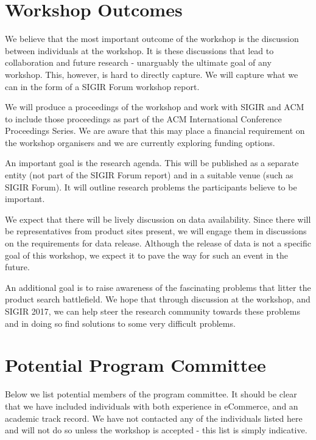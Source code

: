\documentclass{acmart}
\begin{document}
\section{Workshop Outcomes}

We believe that the most important outcome of the workshop is the
discussion between individuals at the workshop.  It is these discussions
that lead to collaboration and future research - unarguably the ultimate
goal of any workshop.  This, however, is hard to directly capture.  We
will capture what we can in the form of a SIGIR Forum workshop report.

We will produce a proceedings of the workshop and work with SIGIR and
ACM to include those proceedings as part of the ACM International
Conference Proceedings Series.  We are aware that this may place a
financial requirement on the workshop organisers and we are currently
exploring funding options.

An important goal is the research agenda.  This will be published as a
separate entity (not part of the SIGIR Forum report) and in a suitable
venue (such as SIGIR Forum).  It will outline research problems the
participants believe to be important.

We expect that there will be lively discussion on data availability.
Since there will be representatives from product sites present, we
will engage them in discussions on the requirements for data release.
Although the release of data is not a specific goal of this workshop, we
expect it to pave the way for such an event in the future.

An additional goal is to raise awareness of the fascinating problems
that litter the product search battlefield.  We hope
that through discussion at the workshop, and SIGIR 2017, we can help
steer the research community towards these problems and in doing so find
solutions to some very difficult problems.

\section{Potential Program Committee}

Below we list potential members of the program committee. It should be
clear that we have included individuals with both experience in
eCommerce, and an academic track record.  We have not contacted any of
the individuals listed here and will not do so unless the workshop is
accepted - this list is simply indicative.
\end{document}
